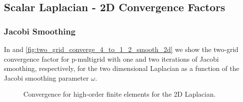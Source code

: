 \documentclass[review]{siamart190516}
\begin{document}
\subsection{Scalar Laplacian - 2D Convergence Factors}\label{sec:2dresults}

\subsubsection{Jacobi Smoothing}

In  and \cref{fig:two_grid_converge_4_to_1_2_smooth_2d} we show the two-grid convergence factor for p-multigrid with one and two iterations of Jacobi smoothing, respectively, for the two dimensional Laplacian as a function of the Jacobi smoothing parameter $\omega$.

\begin{figure}[!tbp]
  \centering
  \hfill
  \caption{Convergence for high-order finite elements for the 2D Laplacian.}
\end{figure}
\end{document}
